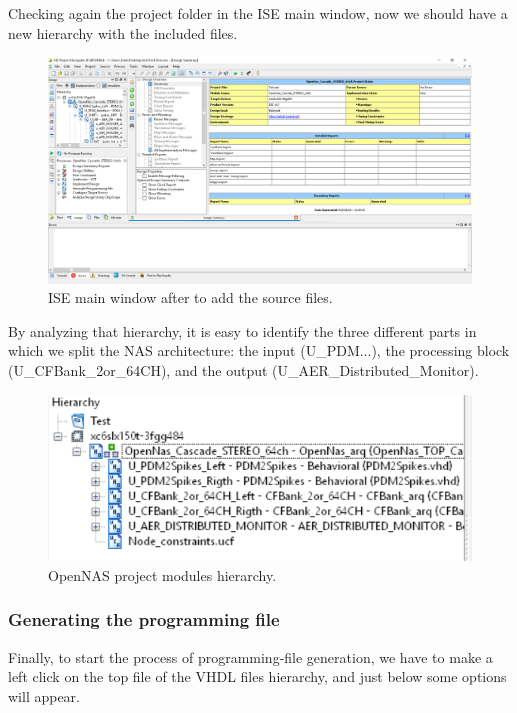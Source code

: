 Checking again the project folder in the ISE main window, now we should have a new hierarchy with the included files.

\begin{figure}[H]
\centering
\includegraphics[width=1\textwidth]{images/Img38_ProjectReady.PNG}
\caption{\label{fig:ISE_sources_added}ISE main window after to add the source files.}
\end{figure}

By analyzing that hierarchy, it is easy to identify the three different parts in which we split the NAS architecture: the input (U\_PDM...), the processing block (U\_CFBank\_2or\_64CH), and the output (U\_AER\_Distributed\_Monitor).

\begin{figure}[H]
\centering
\includegraphics[width=1\textwidth]{images/Img39_Hierarchy.PNG}
\caption{\label{fig:ISE_project_hierarchy}OpenNAS project modules hierarchy.}
\end{figure}

\subsubsection{Generating the programming file}

Finally, to start the process of programming-file generation, we have to make a left click on the top file of the VHDL files hierarchy, and just below some options will appear.


